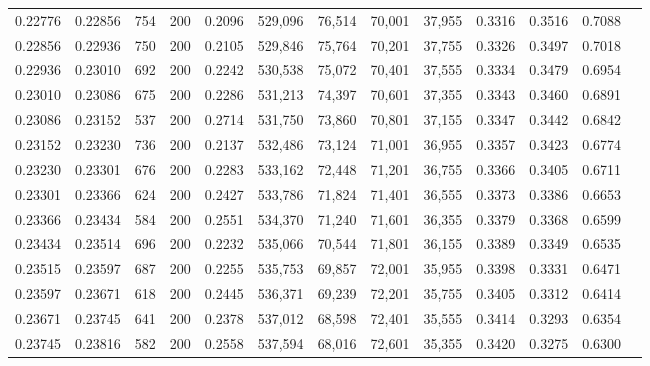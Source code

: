 \begin{tabular}{rrrrrrrrrrrrr}
0.22776 & 0.22856 &   754 & 200 &                                     0.2096 & 529,096 &  76,514 &  70,001 &  37,955 & 0.3316 & 0.3516 & 0.7088 \\
0.22856 & 0.22936 &   750 & 200 &                                     0.2105 & 529,846 &  75,764 &  70,201 &  37,755 & 0.3326 & 0.3497 & 0.7018 \\
0.22936 & 0.23010 &   692 & 200 &                                     0.2242 & 530,538 &  75,072 &  70,401 &  37,555 & 0.3334 & 0.3479 & 0.6954 \\
0.23010 & 0.23086 &   675 & 200 &                                     0.2286 & 531,213 &  74,397 &  70,601 &  37,355 & 0.3343 & 0.3460 & 0.6891 \\
0.23086 & 0.23152 &   537 & 200 &                                     0.2714 & 531,750 &  73,860 &  70,801 &  37,155 & 0.3347 & 0.3442 & 0.6842 \\
0.23152 & 0.23230 &   736 & 200 &                                     0.2137 & 532,486 &  73,124 &  71,001 &  36,955 & 0.3357 & 0.3423 & 0.6774 \\
0.23230 & 0.23301 &   676 & 200 &                                     0.2283 & 533,162 &  72,448 &  71,201 &  36,755 & 0.3366 & 0.3405 & 0.6711 \\
0.23301 & 0.23366 &   624 & 200 &                                     0.2427 & 533,786 &  71,824 &  71,401 &  36,555 & 0.3373 & 0.3386 & 0.6653 \\
0.23366 & 0.23434 &   584 & 200 &                                     0.2551 & 534,370 &  71,240 &  71,601 &  36,355 & 0.3379 & 0.3368 & 0.6599 \\
0.23434 & 0.23514 &   696 & 200 &                                     0.2232 & 535,066 &  70,544 &  71,801 &  36,155 & 0.3389 & 0.3349 & 0.6535 \\
0.23515 & 0.23597 &   687 & 200 &                                     0.2255 & 535,753 &  69,857 &  72,001 &  35,955 & 0.3398 & 0.3331 & 0.6471 \\
0.23597 & 0.23671 &   618 & 200 &                                     0.2445 & 536,371 &  69,239 &  72,201 &  35,755 & 0.3405 & 0.3312 & 0.6414 \\
0.23671 & 0.23745 &   641 & 200 &                                     0.2378 & 537,012 &  68,598 &  72,401 &  35,555 & 0.3414 & 0.3293 & 0.6354 \\
0.23745 & 0.23816 &   582 & 200 &                                     0.2558 & 537,594 &  68,016 &  72,601 &  35,355 & 0.3420 & 0.3275 & 0.6300 \\

\end{tabular}
